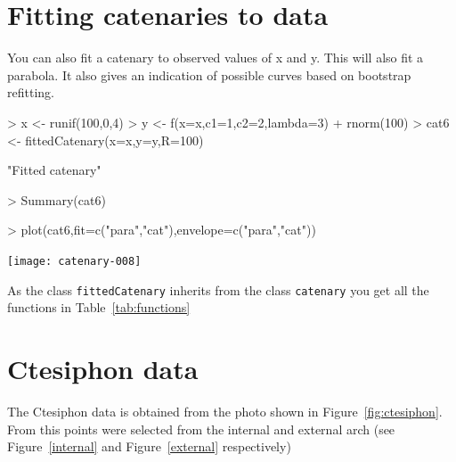 \documentclass{article}
\begin{document}
\section{Fitting catenaries to data}
You can also fit a catenary to observed values of x and y. This will also fit a parabola. It also gives an indication of possible curves based on bootstrap refitting. 
\begin{Schunk}
\begin{Sinput}
> x <- runif(100,0,4)
> y <- f(x=x,c1=1,c2=2,lambda=3) + rnorm(100)
> cat6 <- fittedCatenary(x=x,y=y,R=100)
\end{Sinput}
\begin{Soutput}
[1] "Fitted catenary"
\end{Soutput}
\begin{Sinput}
> Summary(cat6)
\end{Sinput}
\end{Schunk}

\begin{Schunk}
\begin{Sinput}
> plot(cat6,fit=c("para","cat"),envelope=c("para","cat"))
\end{Sinput}
\end{Schunk}
\texttt{[image: catenary-008]}


As the class {\tt fittedCatenary} inherits from the class {\tt catenary} you get all the functions in Table~\ref{tab:functions}
\section{Ctesiphon data}
The Ctesiphon data is obtained from the photo shown in Figure~\ref{fig:ctesiphon}. From this points were selected from the internal and external arch (see Figure~\ref{internal} and Figure~\ref{external} respectively)
\end{document}
